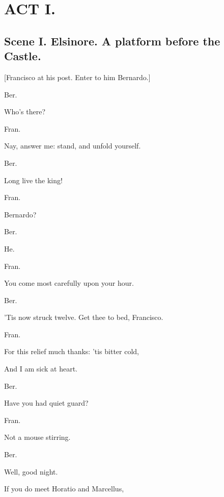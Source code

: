 \documentclass[12pt]{book}
\begin{document}
\obeylines

\newpage



\chapter*{ACT I.}



\section*{Scene I. Elsinore. A platform before the Castle.}



[Francisco at his post. Enter to him Bernardo.]



Ber.

Who's there?



Fran.

Nay, answer me: stand, and unfold yourself.



Ber.

Long live the king!



Fran.

Bernardo?



Ber.

He.



Fran.

You come most carefully upon your hour.



Ber.

'Tis now struck twelve. Get thee to bed, Francisco.



Fran.

For this relief much thanks: 'tis bitter cold,

And I am sick at heart.



Ber.

Have you had quiet guard?



Fran.

Not a mouse stirring.



Ber.

Well, good night.

If you do meet Horatio and Marcellus,
\end{document}
